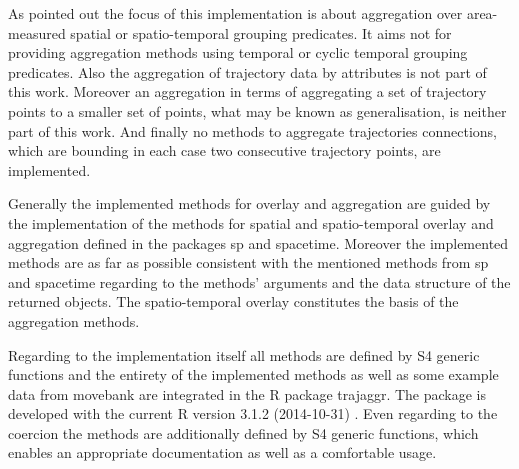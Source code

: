 \documentclass[12pt, oneside, a4paper]{scrbook}
\newcommand{\pkg}[1]{{\normalfont\fontseries{b}\selectfont #1}}
\let\proglang=\textsf
\begin{document}
As pointed out the focus of this implementation is about aggregation over area-measured spatial or spatio-temporal grouping predicates.
It aims not for providing aggregation methods using temporal or cyclic temporal grouping predicates.
Also the aggregation of trajectory data by attributes is not part of this work.
Moreover an aggregation in terms of aggregating a set of trajectory points to a smaller set of points, what may be known as generalisation, is neither part of this work.
And finally no methods to aggregate trajectories connections, which are bounding in each case two consecutive trajectory points, are implemented.
\par\medskip

Generally the implemented methods for overlay and aggregation are guided by the implementation of the methods for spatial and spatio-temporal overlay and aggregation defined in the packages \pkg{sp} and \pkg{spacetime}.
Moreover the implemented methods are as far as possible consistent with the mentioned methods from \pkg{sp} and \pkg{spacetime} regarding to the methods' arguments and the data structure of the returned objects. The spatio-temporal overlay constitutes the basis of the aggregation methods.
\par\medskip

Regarding to the implementation itself all methods are defined by S4 generic functions and the entirety of the implemented methods as well as some example data from movebank are integrated in the \proglang{R} package \pkg{trajaggr}.  The package is developed with the current \proglang{R} version 3.1.2 (2014-10-31) \citep{r_development_core_team_r:_2014}. Even regarding to the coercion the methods are additionally defined by S4 generic functions, which enables an appropriate documentation as well as a comfortable usage.
\par\medskip
\end{document}
